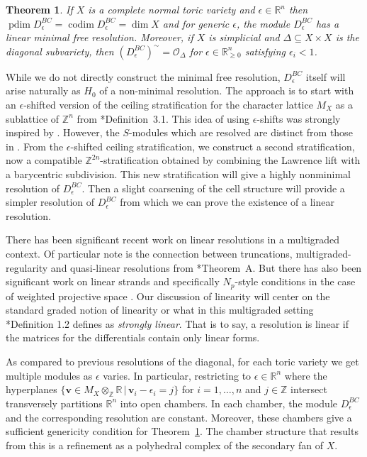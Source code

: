 \documentclass{amsart}
\newcommand{\cO}{\mathcal O}
\newcommand{\ZZ}{\mathbb{Z}}
\newcommand{\RR}{\mathbb{R}}
\newcommand{\Mepsilon}{D^{BC}_{\epsilon}}
\DeclareMathOperator{\codim}{codim}
\DeclareMathOperator{\pdim}{pdim}
\newtheorem{theorem}{Theorem}[section]
\theoremstyle{remark}
\begin{document}
\begin{theorem}
  \label{thm:linear}
  If $X$ is a complete normal toric variety  and $\epsilon\in \RR^n$ then $\pdim \Mepsilon = \codim \Mepsilon = \dim X$ and for generic $\epsilon$, the module $\Mepsilon$ has a linear minimal free resolution.
  Moreover, if $X$ is simplicial and $\Delta\subseteq X\times X$ is the diagonal subvariety, then $\left(\Mepsilon\right)^{\sim} = \cO_{\Delta}$ for $\epsilon\in \RR_{\geq 0}^n$ satisfying $\epsilon_i<1$.
\end{theorem}

While we do not directly construct the minimal free resolution, $\Mepsilon$ itself will arise naturally as $H_0$ of a non-minimal resolution.
The approach is to start with an $\epsilon$-shifted version of the ceiling stratification for the character lattice $M_X$ as a sublattice of $\ZZ^{n}$ from \cite{stratification-paper}*{Definition~3.1}. This idea of using $\epsilon$-shifts was strongly inspired by \cite{And24}. However, the $S$-modules which are resolved are distinct from those in \cite{And24}.
From the $\epsilon$-shifted ceiling stratification, we construct a second stratification, now a compatible $\ZZ^{2n}$-stratification obtained by combining the Lawrence lift with a barycentric subdivision. This new stratification will give a highly nonminimal resolution of $\Mepsilon$. Then a slight coarsening of the cell structure will provide a simpler resolution of $\Mepsilon$ from which we can prove the existence of a linear resolution.

There has been significant recent work on linear resolutions in a multigraded context.
Of particular note is the connection between truncations, multigraded-regularity and quasi-linear
resolutions from \cite{bruce-cranton-heller-sayrafi}*{Theorem~A}.
But there has also been significant work on linear strands \cite{BE24} and specifically
$N_p$-style conditions in the case of weighted projective space \cite{BE25}.
Our discussion of linearity will center on the standard graded notion of linearity
or what in this multigraded setting \cite{BE24}*{Definition 1.2} defines as \emph{strongly linear}.
That is to say, a resolution is linear if the matrices for the differentials contain only linear forms.

As compared to previous resolutions of the diagonal, for each toric variety we get multiple modules as $\epsilon$ varies. In particular, restricting to $\epsilon\in \RR^n$ where the
hyperplanes $\{\bm{v} \in M_X\otimes_{\ZZ} \RR \,|\, \bm{v}_i - \epsilon_i = j \}$ for $i=1,\ldots,n$ and $j\in \ZZ$ intersect transversely partitions $\RR^n$ into open chambers. In each chamber, the module $\Mepsilon$ and the corresponding resolution are constant. Moreover, these chambers give a sufficient genericity condition for Theorem~\ref{thm:linear}. The chamber structure that results from this is a refinement as a polyhedral complex of the secondary fan of $X$.
\end{document}
